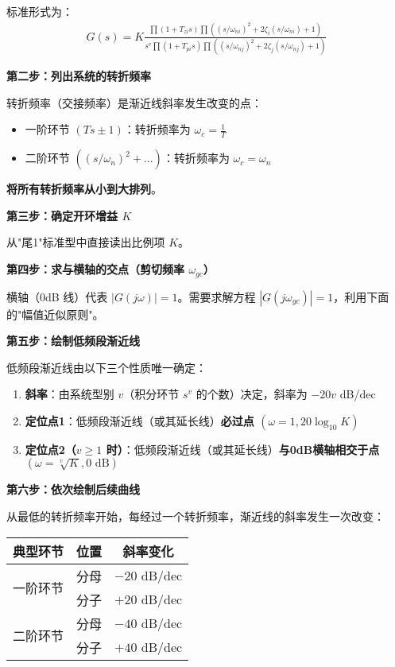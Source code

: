 标准形式为：
\begin{align*}
G(s) = K \frac{\prod(1+T_{zi}s)\prod((s/\omega_{ni})^2+2\zeta_i(s/\omega_{ni})+1)}{s^v\prod(1+T_{pi}s)\prod((s/\omega_{nj})^2+2\zeta_j(s/\omega_{nj})+1)}
\end{align*}

\textbf{第二步：列出系统的转折频率}

转折频率（交接频率）是渐近线斜率发生改变的点：
\begin{itemize}
    \item 一阶环节 $(Ts \pm 1)$：转折频率为 $\omega_c = \frac{1}{T}$
    \item 二阶环节 $((s/\omega_n)^2 + ...)$：转折频率为 $\omega_c = \omega_n$
\end{itemize}

\textbf{将所有转折频率从小到大排列}。

\textbf{第三步：确定开环增益 $K$}

从"尾1"标准型中直接读出比例项 $K$。

\textbf{第四步：求与横轴的交点（剪切频率 $\omega_{gc}$）}

横轴（0dB 线）代表 $|G(j\omega)| = 1$。需要求解方程 $|G(j\omega_{gc})| = 1$，利用下面的"幅值近似原则"。

\textbf{第五步：绘制低频段渐近线}

低频段渐近线由以下三个性质唯一确定：
\begin{enumerate}
    \item \textbf{斜率}：由系统型别 $v$（积分环节 $s^v$ 的个数）决定，斜率为 $-20v$ dB/dec
    \item \textbf{定位点1}：低频段渐近线（或其延长线）\textbf{必过点 $(\omega=1, 20\log_{10}K)$}
    \item \textbf{定位点2（$v \geq 1$ 时）}：低频段渐近线（或其延长线）\textbf{与0dB横轴相交于点 $(\omega = \sqrt[v]{K}, 0\text{ dB})$}
\end{enumerate}

\textbf{第六步：依次绘制后续曲线}

从最低的转折频率开始，每经过一个转折频率，渐近线的斜率发生一次改变：

\begin{center}
\begin{tabular}{|c|c|c|}
\hline
\textbf{典型环节} & \textbf{位置} & \textbf{斜率变化} \\
\hline
\multirow{2}{*}{一阶环节} & 分母 & $-20$ dB/dec \\
\cline{2-3}
& 分子 & $+20$ dB/dec \\
\hline
\multirow{2}{*}{二阶环节} & 分母 & $-40$ dB/dec \\
\cline{2-3}
& 分子 & $+40$ dB/dec \\
\hline
\end{tabular}
\end{center}

